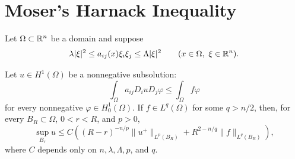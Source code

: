\section{Moser's Harnack Inequality}

Let $\Omega\subset\mathbb{R}^n$ be a domain and suppose
\[
\lambda|\xi|^2\leq a_{ij}(x)\xi_i\xi_j\leq\Lambda|\xi|^2
\qquad(x\in\Omega,\ \xi\in\mathbb{R}^n).
\]

\begin{theorem}\label{hanlin:weaksol-part2-scaled-local-boundedness}
Let $u\in H^1(\Omega)$ be a nonnegative subsolution:
\[
\int_\Omega a_{ij}D_i uD_j\varphi
\leq\int_\Omega f\varphi
\]
for every nonnegative $\varphi\in H^1_0(\Omega)$. If
$f\in L^q(\Omega)$ for some $q>n/2$, then, for every
$B_R\subset\Omega$, $0<r<R$, and $p>0$,
\[
\sup_{B_r}u
\leq C\left((R-r)^{-n/p}\|u^+\|_{L^p(B_R)}
+R^{2-n/q}\|f\|_{L^q(B_R)}\right),
\]
where $C$ depends only on $n,\lambda,\Lambda,p$, and $q$.
\end{theorem}

